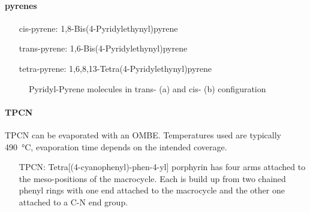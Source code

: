 \paragraph{pyrenes}
\begin{itemize}
\item[cis-pyrene:] 1,8-Bis(4-Pyridylethynyl)pyrene
\item[trans-pyrene:] 1,6-Bis(4-Pyridylethynyl)pyrene
\item[tetra-pyrene:] 1,6,8,13-Tetra(4-Pyridylethynyl)pyrene
\end{itemize}

\begin{figure}[ht]
 \begin{center}
 \end{center}
\caption{Pyridyl-Pyrene molecules in trans- (a) and cis- (b) configuration}
\end{figure}
\paragraph{TPCN}
TPCN can be evaporated with an OMBE. Temperatures used are typically \SI{490}{\celsius}, evaporation time depends on the intended coverage. 
\begin{itemize}
 \item [TPCN:] Tetra[(4-cyanophenyl)-phen-4-yl] porphyrin has four arms attached to the meso-positions of the macrocycle. Each is build up from two chained phenyl rings with one end attached to the macrocycle and the other one attached to a C-N end group.
\end{itemize}

